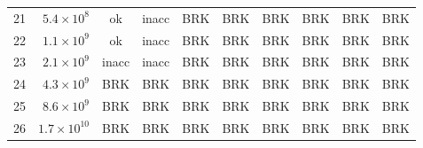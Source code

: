 \begin{tabular}{rr|cc|cc|cc|cc}
21 & $5.4\!\times\!10^{8}$ & \cellcolor{green!15}ok & \cellcolor{orange!30}inacc & \cellcolor{red!25}BRK & \cellcolor{red!25}BRK & \cellcolor{red!25}BRK & \cellcolor{red!25}BRK & \cellcolor{red!25}BRK & \cellcolor{red!25}BRK\\
22 & $1.1\!\times\!10^{9}$ & \cellcolor{green!15}ok & \cellcolor{orange!30}inacc & \cellcolor{red!25}BRK & \cellcolor{red!25}BRK & \cellcolor{red!25}BRK & \cellcolor{red!25}BRK & \cellcolor{red!25}BRK & \cellcolor{red!25}BRK\\
23 & $2.1\!\times\!10^{9}$ & \cellcolor{orange!30}inacc & \cellcolor{orange!30}inacc & \cellcolor{red!25}BRK & \cellcolor{red!25}BRK & \cellcolor{red!25}BRK & \cellcolor{red!25}BRK & \cellcolor{red!25}BRK & \cellcolor{red!25}BRK\\
24 & $4.3\!\times\!10^{9}$ & \cellcolor{red!25}BRK & \cellcolor{red!25}BRK & \cellcolor{red!25}BRK & \cellcolor{red!25}BRK & \cellcolor{red!25}BRK & \cellcolor{red!25}BRK & \cellcolor{red!25}BRK & \cellcolor{red!25}BRK\\
25 & $8.6\!\times\!10^{9}$ & \cellcolor{red!25}BRK & \cellcolor{red!25}BRK & \cellcolor{red!25}BRK & \cellcolor{red!25}BRK & \cellcolor{red!25}BRK & \cellcolor{red!25}BRK & \cellcolor{red!25}BRK & \cellcolor{red!25}BRK\\
26 & $1.7\!\times\!10^{10}$ & \cellcolor{red!25}BRK & \cellcolor{red!25}BRK & \cellcolor{red!25}BRK & \cellcolor{red!25}BRK & \cellcolor{red!25}BRK & \cellcolor{red!25}BRK & \cellcolor{red!25}BRK & \cellcolor{red!25}BRK\\
\bottomrule
\end{tabular}
